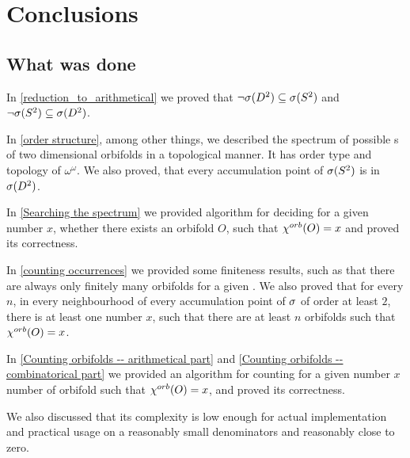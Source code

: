 \chapter{Conclusions}

\section{What was done}
In \ref{reduction_to_arithmetical} we proved that $\neg {{\sigma}(D^2)} \subseteq {{\sigma}(S^2)}$ and 
$\neg {{\sigma}(S^2)} \subseteq {{\sigma}(D^2)}$. 

In \ref{order structure}, among other things, we described the spectrum of possible \Eoc s 
of two dimensional orbifolds in a topological manner. 
It has order type and topology of $\omega^\omega$. 
We also proved, that every accumulation point of ${{\sigma}(S^2)}$ is in ${{\sigma}(D^2)}$.

In \ref{Searching the spectrum} 
we provided algorithm for deciding for a given number $x$, whether 
there exists an orbifold $O$, such that ${\chi^{orb}(O)} = x$ and proved its correctness.

In \ref{counting occurrences} we provided some finiteness results, such as that 
there are always only finitely many 
orbifolds for a given \Eoc. 
We also proved that for every $n$, in every neighbourhood of every accumulation point 
of ${\sigma}$ of order at least $2$, there is at least one number $x$, such that there are at least 
$n$ orbifolds such that ${\chi^{orb}(O)} = x$.

In \ref{Counting orbifolds -- arithmetical part} 
and \ref{Counting orbifolds -- combinatorical part} 
we provided an algorithm 
 for counting for a given number $x$ number of orbifold such that ${\chi^{orb}(O)} = x$,
and proved its correctness. 
 
We also discussed that its complexity is low enough for actual implementation 
and practical usage on a reasonably small denominators and reasonably close to zero.




